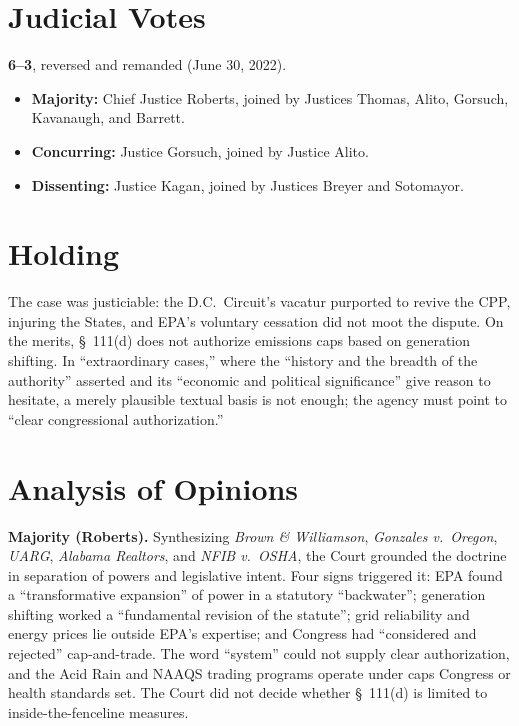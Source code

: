 \documentclass[12pt]{article}
\begin{document}
\section{Judicial Votes}

\textbf{6--3}, reversed and remanded (June 30, 2022).
\begin{itemize}
\item \textbf{Majority:} Chief Justice Roberts, joined by Justices Thomas, Alito, Gorsuch, Kavanaugh, and Barrett.
\item \textbf{Concurring:} Justice Gorsuch, joined by Justice Alito.
\item \textbf{Dissenting:} Justice Kagan, joined by Justices Breyer and Sotomayor.
\end{itemize}

\section{Holding}

The case was justiciable: the D.C.\ Circuit's vacatur purported to revive the CPP, injuring the States, and EPA's voluntary cessation did not moot the dispute. On the merits, \S~111(d) does not authorize emissions caps based on generation shifting. In ``extraordinary cases,'' where the ``history and the breadth of the authority'' asserted and its ``economic and political significance'' give reason to hesitate, a merely plausible textual basis is not enough; the agency must point to ``clear congressional authorization.''

\section{Analysis of Opinions}

\textbf{Majority (Roberts).} Synthesizing \textit{Brown \& Williamson}, \textit{Gonzales v.\ Oregon}, \textit{UARG}, \textit{Alabama Realtors}, and \textit{NFIB v.\ OSHA}, the Court grounded the doctrine in separation of powers and legislative intent. Four signs triggered it: EPA found a ``transformative expansion'' of power in a statutory ``backwater''; generation shifting worked a ``fundamental revision of the statute''; grid reliability and energy prices lie outside EPA's expertise; and Congress had ``considered and rejected'' cap-and-trade. The word ``system'' could not supply clear authorization, and the Acid Rain and NAAQS trading programs operate under caps Congress or health standards set. The Court did not decide whether \S~111(d) is limited to inside-the-fenceline measures.
\end{document}
